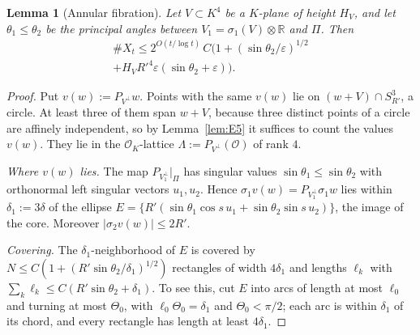 \documentclass[aps,prx,twocolumn,superscriptaddress,nofootinbib,longbibliography]{revtex4-2}
\theoremstyle{plain}
\newtheorem{lemma}{Lemma}
\theoremstyle{definition}
\theoremstyle{remark}
\newcommand{\R}{\mathbb{R}}
\begin{document}
\begin{lemma}[Annular fibration]\label{lem:G1}
Let $V\subset K^4$ be a $K$-plane of height $H_V$, and let $\theta_1\le\theta_2$ be the principal angles between
$V_1=\sigma_1(V)\otimes\R$ and $\Pi$. Then
\begin{multline*}
\#X_t\le2^{O(t/\log t)}\,C\big(1+(\sin\theta_2/\varepsilon)^{1/2}\\
+H_VR'^4\varepsilon(\sin\theta_2+\varepsilon)\big).
\end{multline*}
\end{lemma}
\begin{proof}
Put $v(w):=P_{V^\perp}w$. Points with the same $v(w)$ lie on $(w+V)\cap S^3_{R'}$, a circle. At least three of them span $w+V$, because
three distinct points of a circle are affinely independent, so by Lemma~\ref{lem:E5} it suffices to count the values $v(w)$. They lie in the $\mathcal O_K$-lattice
$\Lambda:=P_{V^\perp}(\mathcal O)$ of rank $4$.

\emph{Where $v(w)$ lies.} The map $P_{V_1^\perp}|_\Pi$ has singular values $\sin\theta_1\le\sin\theta_2$ with
orthonormal left singular vectors $u_1,u_2$. Hence $\sigma_1v(w)=P_{V_1^\perp}\sigma_1w$ lies within
$\delta_1:=3\delta$ of the ellipse $E=\{R'(\sin\theta_1\cos s\,u_1+\sin\theta_2\sin s\,u_2)\}$, the image of the
core. Moreover $|\sigma_2v(w)|\le2R'$.

\emph{Covering.} The $\delta_1$-neighborhood of $E$ is covered by
$N\le C(1+(R'\sin\theta_2/\delta_1)^{1/2})$ rectangles of width $4\delta_1$ and lengths $\ell_k$ with
$\sum_k\ell_k\le C(R'\sin\theta_2+\delta_1)$. To see this, cut $E$ into arcs of length at most
$\ell_0$ and turning at most $\Theta_0$, with $\ell_0\Theta_0=\delta_1$ and $\Theta_0<\pi/2$; each arc is within $\delta_1$
of its chord, and every rectangle has length at least $4\delta_1$.


\end{proof}
\end{document}
